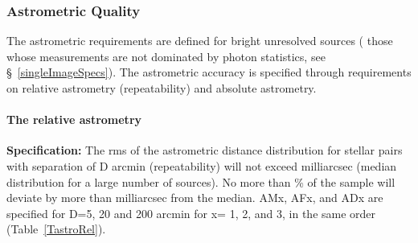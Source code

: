 \subsubsection{Astrometric Quality}

The astrometric requirements are defined for bright unresolved sources (\ie
those whose measurements are not dominated by photon statistics, see
\S~\ref{singleImageSpecs}). The astrometric accuracy is specified through
requirements on relative astrometry (repeatability) and absolute
astrometry.


\paragraph{The relative astrometry\\}

\textbf{Specification:} The rms of the astrometric distance distribution for
stellar pairs with separation of D arcmin (repeatability) will not exceed
milliarcsec (median distribution for a large number of
sources). No more than
\% of the sample will deviate by more than
milliarcsec from the median. AMx, AFx,
and ADx are specified for D=5, 20 and 200 arcmin for x= 1, 2, and 3, in the
same order (Table~\ref{TastroRel}).

